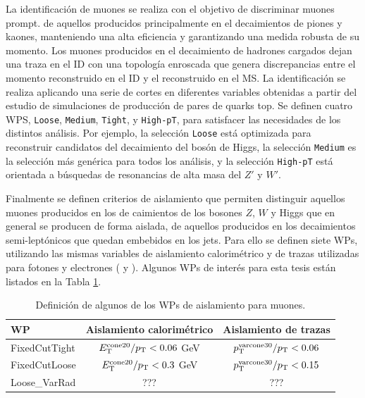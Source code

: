 La identificación de muones se realiza con el objetivo de discriminar muones prompt. de aquellos producidos principalmente en el decaimientos de piones y kaones, manteniendo una alta eficiencia y garantizando una medida robusta de su momento. Los muones producidos en el decaimiento de hadrones cargados dejan una traza en el ID con una topología enroscada 
que genera discrepancias entre el momento reconstruido en el ID y el reconstruido en el MS. La identificación se realiza aplicando una serie de cortes en diferentes variables \cite{PERF-2015-10} obtenidas a partir del estudio de simulaciones de producción de pares de quarks top. Se definen cuatro WPS, \texttt{Loose}, \texttt{Medium}, \texttt{Tight}, y \texttt{High-pT}, para satisfacer las necesidades de los distintos análisis. Por ejemplo, la selección \texttt{Loose} está optimizada para reconstruir candidatos del decaimiento del bosón de Higgs, la selección \texttt{Medium} es la selección más genérica para todos los análisis, y la selección \texttt{High-pT} está orientada a búsquedas de resonancias de alta masa del $Z'$ y $W'$. 

Finalmente se definen criterios de aislamiento que permiten distinguir aquellos muones producidos en los de caimientos de los bosones $Z$, $W$ y Higgs que en general se producen de forma aislada, de aquellos producidos en los decaimientos semi-leptónicos que quedan embebidos en los jets. Para ello se definen siete WPs, utilizando las mismas variables de aislamiento calorimétrico y de trazas utilizadas para fotones y electrones ( y ). Algunos WPs de interés para esta tesis están listados en la Tabla \ref{tab:muon_WPs}.

\begin{table} 
\centering
\caption{Definición de algunos de los WPs de aislamiento para muones. }
  \begin{tabular}{ l c c}

  \hline

  \hline

    WP & Aislamiento calorimétrico & Aislamiento de trazas \\

    \hline
    \hline

    FixedCutTight & $E_{\text{T}}^{\text{cone20}}/p_{\text{T}} < 0.06$ GeV & $p_{\text{T}}^{\text{varcone30}}/p_{\text{T}}<0.06$ \\

    FixedCutLoose & $E_{\text{T}}^{\text{cone20}}/p_{\text{T}} < 0.3$ GeV  & $p_{\text{T}}^{\text{varcone30}}/p_{\text{T}}<0.15$ \\

    \hline

    Loose\_VarRad & ??? & ??? \\

    \hline

  \end{tabular}
\label{tab:muon_WPs}
\end{table}

